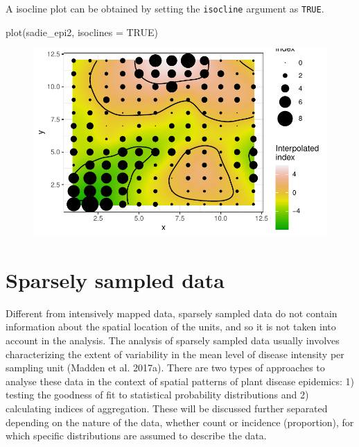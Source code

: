 \documentclass[
  letterpaper,
  DIV=11,
  numbers=noendperiod]{scrreprt}
\newenvironment{Shaded}{\begin{snugshade}}{\end{snugshade}}
\newcommand{\AttributeTok}[1]{\textcolor[rgb]{0.40,0.45,0.13}{#1}}
\newcommand{\ConstantTok}[1]{\textcolor[rgb]{0.56,0.35,0.01}{#1}}
\newcommand{\FunctionTok}[1]{\textcolor[rgb]{0.28,0.35,0.67}{#1}}
\newcommand{\NormalTok}[1]{\textcolor[rgb]{0.00,0.23,0.31}{#1}}
\begin{document}
A isocline plot can be obtained by setting the \texttt{isocline}
argument as \texttt{TRUE}.

\begin{Shaded}
\begin{Highlighting}[]
\FunctionTok{plot}\NormalTok{(sadie\_epi2, }\AttributeTok{isoclines =} \ConstantTok{TRUE}\NormalTok{)}
\end{Highlighting}
\end{Shaded}

\begin{figure}[H]

{\centering \includegraphics{./spatial-tests_files/figure-pdf/unnamed-chunk-84-1.pdf}

}

\end{figure}

\hypertarget{sparsely-sampled-data}{%
\section{Sparsely sampled data}\label{sparsely-sampled-data}}

Different from intensively mapped data, sparsely sampled data do not
contain information about the spatial location of the units, and so it
is not taken into account in the analysis. The analysis of sparsely
sampled data usually involves characterizing the extent of variability
in the mean level of disease intensity per sampling unit (Madden et al.
2017a). There are two types of approaches to analyse these data in the
context of spatial patterns of plant disease epidemics: 1) testing the
goodness of fit to statistical probability distributions and 2)
calculating indices of aggregation. These will be discussed further
separated depending on the nature of the data, whether count or
incidence (proportion), for which specific distributions are assumed to
describe the data.
\end{document}
